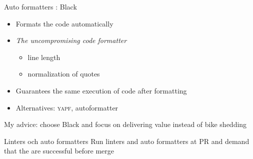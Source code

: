 \begin{frame}{Auto formatters : Black}
  \begin{itemize}
    \item Formats the code automatically
    \item \textit{The uncompromising code formatter}
      \begin{itemize}
        \item line length
        \item normalization of quotes
      \end{itemize}
    \item Guarantees the same execution of code after formatting
    \item Alternatives: \textsc{yapf}, autoformatter
  \end{itemize}


  My advice: choose Black and focus on delivering value instead of bike shedding
\end{frame}

\begin{frame}[standout]{Linters och auto formatters}
  Run linters and auto formatters at PR and demand that the are successful before merge
\end{frame}


